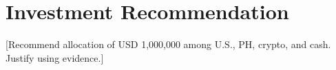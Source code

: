 \section{Investment Recommendation}
{} [Recommend allocation of USD 1,000,000 among U.S., PH, crypto, and cash. Justify using evidence.]

\begin{Shaded}
\begin{Highlighting}[]
\end{Highlighting}
\end{Shaded}

